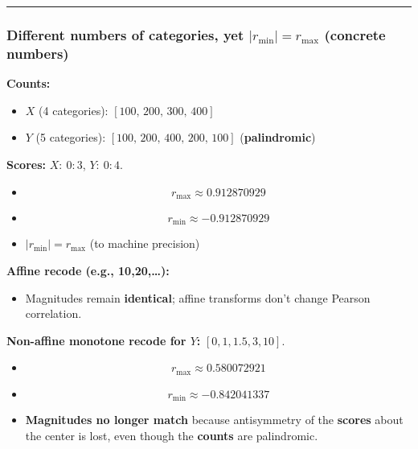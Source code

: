\documentclass[
  12pt,
]{article}
\providecommand{\tightlist}{%
  \setlength{\itemsep}{0pt}\setlength{\parskip}{0pt}}
\theoremstyle{plain}
\theoremstyle{definition}
\theoremstyle{remark}
\begin{document}
\begin{center}\rule{0.5\linewidth}{0.5pt}\end{center}

\subsubsection{\texorpdfstring{\textbf{Different numbers of categories,
yet \(|r_{\min}|=r_{\max}\)} (concrete
numbers)}{Different numbers of categories, yet \textbar r\_\{\textbackslash min\}\textbar=r\_\{\textbackslash max\} (concrete numbers)}}\label{different-numbers-of-categories-yet-r_minr_max-concrete-numbers}

\textbf{Counts:}

\begin{itemize}
\item
  \(X\) (4 categories): \([100,\,200,\,300,\,400]\)
\item
  \(Y\) (5 categories): \([100,\,200,\,400,\,200,\,100]\)
  (\textbf{palindromic})
\end{itemize}

\textbf{Scores:} \(X:\ 0{:}3\), \(Y:\ 0{:}4\).

\begin{itemize}
\item
  \[r_{\max}\approx 0.912870929\]
\item
  \[r_{\min}\approx -0.912870929\]
\item
  \(|r_{\min}| = r_{\max}\) (to machine precision)
\end{itemize}

\textbf{Affine recode (e.g., 10,20,\ldots):}

\begin{itemize}
\tightlist
\item
  Magnitudes remain \textbf{identical}; affine transforms don't change
  Pearson correlation.
\end{itemize}

\textbf{Non-affine monotone recode for \(Y\):} \([0,1,1.5,3,10]\).

\begin{itemize}
\item
  \[r_{\max}\approx 0.580072921\]
\item
  \[r_{\min}\approx -0.842041337\]
\item
  \textbf{Magnitudes no longer match} because antisymmetry of the
  \textbf{scores} about the center is lost, even though the
  \textbf{counts} are palindromic.
\end{itemize}
\end{document}
